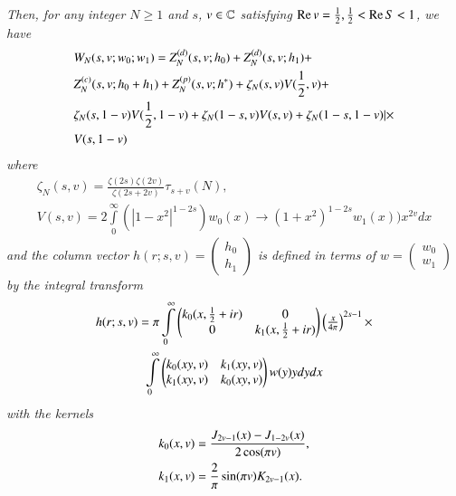 \textit{Then, for any integer $N \geqslant 1$ and $s$, $v \in \mathbb{C}$ satisfying $\operatorname{Re} v = \frac{1}{2},\frac{1}{2} < \operatorname{Re} S<1$, we have}
\begin{align}
& W_N(s, v; w_0; w_1) = Z^{(d)}_N (s, v; h_0) + Z^{(d)}_N (s,v;h_1) + \label{art7-eq1.62} \\
& Z^{(c)}_N (s,v; h_0 +h_1) + Z^{(p)}_N (s, v; h^\ast) + \zeta_N (s,v)V (\frac{1}{2},v) + \notag\\
& \zeta_N (s, 1-v) V (\frac{1}{2}, 1-v) + \zeta_N (1-s,v) V(s,v) + \zeta_N(1-s, 1-v) |\times \notag\\
& V (s, 1-v) \notag
\end{align}
\textit{where}
\begin{gather}
\zeta_N(s,v) = \frac{\zeta(2s) \zeta(2v)}{\zeta(2s+2v)} \tau_{s+v} (N), \label{art7-eq1.63}\\
V(s,v) = 2 \int\limits^\infty_0 (|1-x^2|^{1-2s}) w_0 (x) \to (1+x^2)^{1-2s} w_1(x)) x^{2v} dx \label{art7-eq1.64}
\end{gather}
\textit{and the column vector $h(r;s, v) = \left(\begin{matrix}
h_0 \\h_1\end{matrix}\right)$ is defined in terms of $w = \left(\begin{matrix}
w_0 \\ w_1 \end{matrix}\right)$ by the integral transform}
\begin{gather}
h(r; s, v) = \pi \int\limits^\infty_0 
\begin{pmatrix} 
k_0 (x, \frac{1}{2} + ir) & 0\\
0 & k_1 (x, \frac{1}{2} + ir)
\end{pmatrix}
\begin{pmatrix}
\frac{x}{4\pi}
\end{pmatrix}^{2s-1} \times \label{art7-eq1.65}\\
 \int\limits^\infty_0 
\begin{pmatrix}
k_0 (xy, v) & k_1 (xy, v) \\
k_1 (xy, v) & k_0 (xy, v)
\end{pmatrix} w(y) y dy dx \notag
\end{gather}\pageoriginale
\textit{with the kernels}
\begin{align}
k_0 (x,v) & = \frac{J_{2v-1} (x) - J_{1-2v} (x)}{2 \cos (\pi v)},\label{art7-eq1.66}\\
k_1 (x,v) & = \frac{2}{\pi} \sin (\pi v) K_{2v -1} (x). \notag
\end{align}

